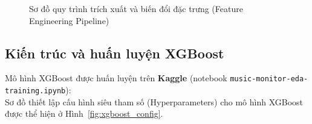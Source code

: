 \documentclass[12pt,a4paper]{report}
\begin{document}
\begin{figure}[H]
{
    }
    \caption{Sơ đồ quy trình trích xuất và biến đổi đặc trưng (Feature Engineering Pipeline)}
    \label{fig:feature_pipeline}
\end{figure}

\subsection{Kiến trúc và huấn luyện XGBoost}

Mô hình XGBoost được huấn luyện trên \textbf{Kaggle} (notebook \texttt{music-monitor-\allowbreak{}eda-\allowbreak{}training.ipynb}):\\

Sơ đồ thiết lập cấu hình siêu tham số (Hyperparameters) cho mô hình XGBoost được thể hiện ở Hình~\ref{fig:xgboost_config}.
\end{document}
